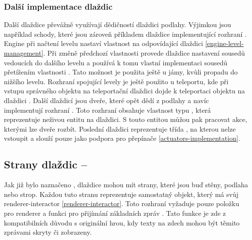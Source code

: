 \subsubsection{Další implementace dlaždic}
Další dlaždice převážně využívají dědičností dlaždici podlahy. Výjimkou jsou například schody,
které jsou zároveň příkladem dlaždice implementující rozhraní . Engine při načtení 
levelu nastaví vlastnost  na odpovídající dlaždici \vref{engine-level-management}.
Při změně předchozí vlastnosti provede dlaždice nastavení sousedů vedoucích do dalšího levelu a používá k tomu vlastní 
implementaci sousedů přetížením vlastnosti . Tato možnost je použita ještě u jámy, kvůli propadu do nižšího levelu. 
Rozhraní spojující levely je ještě použito u teleportu, kde při vstupu správného objektu na teleportační dlaždici 
dojde k teleportaci objektu na dlaždici . Další dlaždicí jsou dveře, které opět 
dědí z podlahy a navíc implementují rozhraní . Toto rozhraní obsahuje vlastnost typu ,
která reprezentuje neživou entitu na dlaždici. S touto entitou můžou pak pracovat akce, kterými lze dveře rozbít.
Poslední dlaždici reprezentuje třída , na kterou nelze vstoupit a slouží pouze jako podpora
pro přepínače \vref{actuators-implementation}.

\subsection{Strany dlaždic -- }\label{tile-sides-section}
Jak již bylo naznačeno , dlaždice mohou mít strany, které jsou buď stěny, podlaha nebo strop.
Každou tuto stranu reprezentuje samostatný objekt, který má svůj renderer-interactor \vref{renderer-interactor}. 
Toto rozhraní vyžaduje pouze položku pro renderer a funkci pro přijímání základních zpráv . 
Tato funkce je zde z kompatibilních důvodu s originální hrou, kdy texty na zdech mohou být těmito 
zprávami skryty či zobrazeny.

